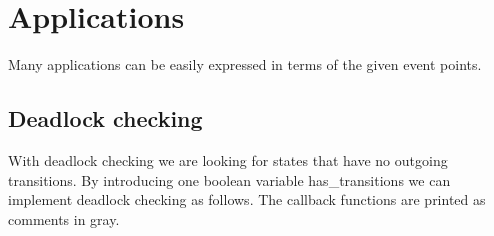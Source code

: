 \documentclass{article}
\begin{document}

\newpage
\section{Applications}

Many applications can be easily expressed in terms of the given event points.

\subsection{Deadlock checking}
With deadlock checking we are looking for states that have no outgoing transitions.
By introducing one boolean variable has\_transitions we can implement deadlock checking as follows. The callback functions are printed as comments in gray.
\end{document}

